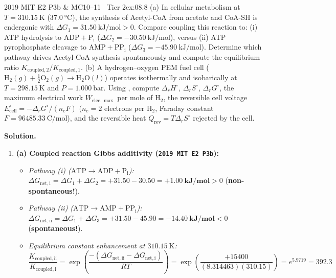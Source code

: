\begin{workedexample}{2019 MIT E2 P3b \& MC10--11 \textbar\ Tier 2}{ex:08.8}
(a) In cellular metabolism at $T = \SI{310.15}{\kelvin}$ ($\SI{37.0}{\celsius}$), the synthesis of Acetyl-CoA from acetate and CoA-SH is endergonic with $\Delta G_1 = \SI{+31.50}{\kilo\joule\per\mole} > 0$. Compare coupling this reaction to: (i) ATP hydrolysis to $\mathrm{ADP} + \mathrm{P_i}$ ($\Delta G_2 = \SI{-30.50}{\kilo\joule\per\mole}$), versus (ii) ATP pyrophosphate cleavage to $\mathrm{AMP} + \mathrm{PP_i}$ ($\Delta G_3 = \SI{-45.90}{\kilo\joule\per\mole}$). Determine which pathway drives Acetyl-CoA synthesis spontaneously and compute the equilibrium ratio $K_{\mathrm{coupled},2}/K_{\mathrm{coupled},1}$.
(b) A hydrogen--oxygen PEM fuel cell ($\mathrm{H_2}(g) + \frac{1}{2}\mathrm{O_2}(g) \to \mathrm{H_2O}(l)$) operates isothermally and isobarically at $T = \SI{298.15}{\kelvin}$ and $P = \SI{1.000}{\bar}$. Using , compute $\Delta_r H^\circ$, $\Delta_r S^\circ$, $\Delta_r G^\circ$, the maximum electrical work $W_{\mathrm{elec,\max}}$ per mole of $\mathrm{H_2}$, the reversible cell voltage $E_{\mathrm{cell}}^\circ = -\Delta_r G^\circ / (n_e F)$ ($n_e = 2$ electrons per $\mathrm{H_2}$, Faraday constant $F = \SI{96485.33}{\coulomb\per\mole}$), and the reversible heat $Q_{\mathrm{rev}} = T\Delta_r S^\circ$ rejected by the cell.
\par\smallskip\noindent
\textbf{Solution.}
\begin{enumerate}
  \item \textbf{(a) Coupled reaction Gibbs additivity (\texttt{2019 MIT E2 P3b}):}
  \begin{itemize}
    \item \emph{Pathway (i) ($\mathrm{ATP}\to\mathrm{ADP}+\mathrm{P_i}$):} $\Delta G_{\mathrm{net,i}} = \Delta G_1 + \Delta G_2 = +31.50 - 30.50 = \mathbf{+\SI{1.00}{\kilo\joule\per\mole}} > 0$ (\textbf{non-spontaneous!}).
    \item \emph{Pathway (ii) ($\mathrm{ATP}\to\mathrm{AMP}+\mathrm{PP_i}$):} $\Delta G_{\mathrm{net,ii}} = \Delta G_1 + \Delta G_3 = +31.50 - 45.90 = \mathbf{\SI{-14.40}{\kilo\joule\per\mole}} < 0$ (\textbf{spontaneous!}).
    \item \emph{Equilibrium constant enhancement at $\SI{310.15}{\kelvin}$:}
    \[
      \frac{K_{\mathrm{coupled,ii}}}{K_{\mathrm{coupled,i}}} = \exp\left(\frac{-(\Delta G_{\mathrm{net,ii}} - \Delta G_{\mathrm{net,i}})}{RT}\right) = \exp\left(\frac{+15400}{(8.314463)(310.15)}\right) = e^{5.9719} = \mathbf{392.3}
\]
\end{itemize}
\end{enumerate}
\end{workedexample}
